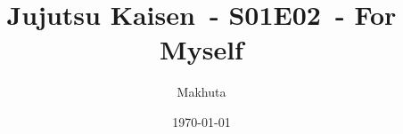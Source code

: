 \def\myanime{Jujutsu Kaisen}
\def\myserie{01}
\def\myepisode{02}
\def\myepisodename{For Myself}
\def\mytimes{}
\def\mytitle{\myanime\ - S\myserie E\myepisode\ - \myepisodename\mytimes}
\title{\Large{\mytitle}}
\author{Makhuta}
\date{\today}